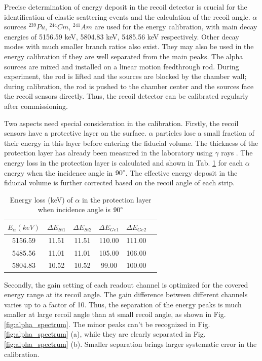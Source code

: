\documentclass[number]{elsarticle}
\begin{document}
Precise determination of energy deposit in the recoil detector is crucial for the identification of elastic scattering events and the calculation of the recoil angle.
\(\alpha\) sources \(^{239}Pu\), \(^{244}Cm\), \(^{241}Am\) are used for the energy calibration, with main decay energies of 5156.59 keV, 5804.83 keV, 5485.56 keV \cite{nuclear_data} respectively.
Other decay modes with much smaller branch ratios also exist. They may also be used in the energy calibration if they are well separated from the main peaks.
The alpha sources are mixed and installed on a linear motion feedthrough rod.
During experiment, the rod is lifted and the sources are blocked by the chamber wall;
during calibration, the rod is pushed to the chamber center and the sources face the recoil sensors directly.
Thus, the recoil detector can be calibrated regularly after commissioning.

Two aspects need special consideration in the calibration. Firstly, the recoil sensors have a protective layer on the surface. 
\(\alpha\) particles lose a small fraction of their energy in this layer before entering the fiducial volume.
The thickness of the protection layer has already been measured in the laboratory using \(\gamma\) rays \cite{recoil_article}.
The energy loss in the protection layer is calculated and shown in Tab. \ref{tab:dead_layer} for each $\alpha$ energy when the incidence angle in $90\degree$.
The effective energy deposit in the fiducial volume is further corrected based
on the recoil angle of each strip.

\begin{table}[htbp]
\label{tab:dead_layer}
\caption{Energy loss (keV) of $\alpha$ in the protection layer when incidence angle is $90\degree$}
\centering
\begin{tabular}{cccccc}
\hline
\(E_{\alpha} (keV)\) & \(\Delta E_{Si1}\) & \(\Delta E_{Si2}\) & \(\Delta E_{Ge1}\) & \(\Delta E_{Ge2}\) \\
\hline
5156.59 & 11.51 & 11.51 & 110.00 & 111.00 \\
5485.56 & 11.01 & 11.01 & 105.00 & 106.00 \\
5804.83 & 10.52 & 10.52 & 99.00  & 100.00 \\
\hline
\end{tabular}
\end{table}

Secondly, the gain setting of each readout channel is optimized for the covered energy range at its recoil angle.
The gain difference between different channels varies up to a factor of 10.
Thus, the separation of the energy peaks is much smaller at large recoil angle than at small recoil angle, as shown in Fig. \ref{fig:alpha_spectrum}.
The minor peaks can't be recognized in Fig. \ref{fig:alpha_spectrum} (a), while they are clearly separated in Fig. \ref{fig:alpha_spectrum} (b).
Smaller separation brings larger systematic error in the calibration.
\end{document}
